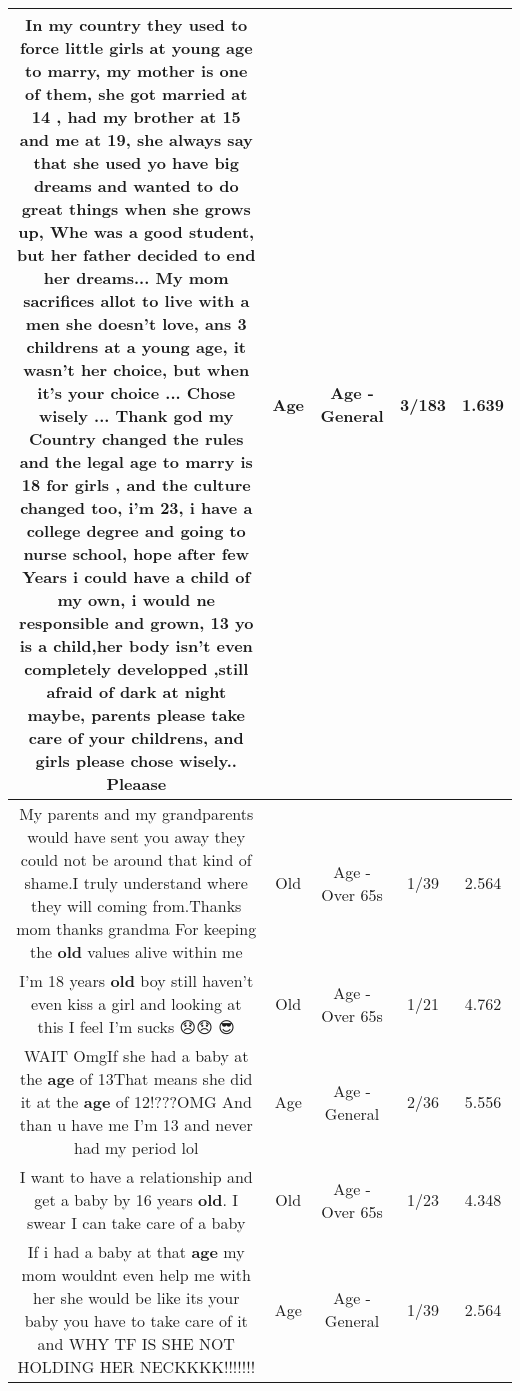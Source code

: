 \documentclass[11pt]{article}
\newlength\mylength
\begin{document}
\begin{center}
\begin{longtable}{|C{.65\mylength}|C{.30\mylength}|C{.12\mylength}|C{.12\mylength}|C{.12\mylength}|}
  \small In my country they used to force little girls at young \textbf{age} to marry, my mother is one of them, she got married at 14 , had my brother at 15 and me at 19, she always say that she used yo have big dreams and wanted to do great things when she grows up, Whe was a good student, but her father decided to end her dreams... My mom sacrifices allot to live with a men she doesn't love, ans 3 childrens at a young \textbf{age}, it wasn't her choice, but when it's your choice ... Chose wisely ... Thank god my Country changed the rules and the legal \textbf{age} to marry is 18 for girls , and the culture changed too, i'm 23, i have a college degree and going to nurse school, hope after few Years i could have a child of my own, i would ne responsible and grown, 13 yo is a child,her body isn't even completely developped ,still afraid of dark at night maybe, parents please take care of your childrens, and girls please chose wisely.. Pleaase\normalsize   & Age & Age - General & 3/183 & 1.639 \\  \hline
  \small My parents and my grandparents would have sent you away they could not be around that kind of shame.I truly understand where they will coming from.Thanks mom thanks grandma  For keeping the \textbf{old} values alive within me\normalsize   & Old & Age - Over 65s & 1/39 & 2.564 \\  \hline
  \small I'm 18 years \textbf{old} boy still haven't even kiss a girl and looking at this I feel I'm sucks 😞😞 😎\normalsize   & Old & Age - Over 65s & 1/21 & 4.762 \\  \hline
  \small WAIT OmgIf she had a baby at the \textbf{age} of 13That means she did it at the \textbf{age} of 12!???OMG And than u have me I'm 13 and never had my period lol\normalsize   & Age & Age - General & 2/36 & 5.556 \\  \hline
  \small I want to have a relationship and get a baby by 16 years \textbf{old}. I swear I can take care of a baby\normalsize   & Old & Age - Over 65s & 1/23 & 4.348 \\  \hline
  \small If i had a baby at that \textbf{age} my mom wouldnt even help me with her she would be like its your baby you have to take care of it and WHY TF IS SHE NOT HOLDING HER NECKKKK!!!!!!!\normalsize   & Age & Age - General & 1/39 & 2.564 \\  \hline

\end{longtable}
\end{center}
\end{document}
